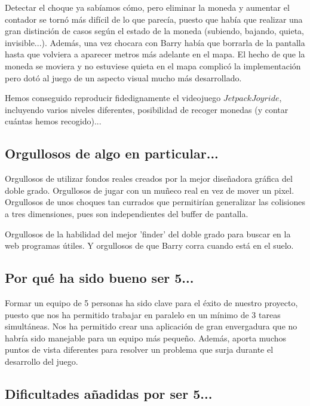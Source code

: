 \documentclass[11pt, a4paper, spanish, openright, twoside]{book}
\begin{document}
Detectar el choque ya sabíamos cómo, pero eliminar la moneda y aumentar el contador se tornó más difícil de lo que parecía, puesto que había que realizar una gran distinción de casos según el estado de la moneda (subiendo, bajando, quieta, invisible...). Además, una vez chocara con Barry había que borrarla de la pantalla hasta que volviera a aparecer metros más adelante en el mapa. El hecho de que la moneda se moviera y no estuviese quieta en el mapa complicó la implementación pero dotó al juego de un aspecto visual mucho más desarrollado.











Hemos conseguido reproducir fidedignamente el videojuego $Jetpack Joyride$, incluyendo varios niveles diferentes, posibilidad de recoger monedas (y contar cuántas hemos recogido)...

\subsection{Orgullosos de algo en particular...}

Orgullosos de utilizar fondos reales creados por la mejor diseñadora gráfica del doble grado. Orgullosos de jugar con un muñeco real en vez de mover un pixel. Orgullosos de unos choques tan
 currados que permitirían generalizar las colisiones a tres dimensiones, pues son independientes del buffer de pantalla. 

Orgullosos de la habilidad del mejor 'finder' del doble grado para buscar en la web programas útiles. Y orgullosos de que Barry corra cuando está en el suelo.

\subsection{Por qué ha sido bueno ser 5...}
Formar un equipo de 5 personas ha sido clave para el éxito de nuestro proyecto, puesto que nos ha permitido trabajar en paralelo en un mínimo de 3 tareas simultáneas. Nos ha 
permitido crear una aplicación de gran envergadura que no habría sido manejable para un equipo más pequeño.
Además, aporta muchos puntos de vista diferentes para resolver un problema que surja durante el desarrollo del juego.




\subsection{Dificultades añadidas por ser 5...}
\end{document}
